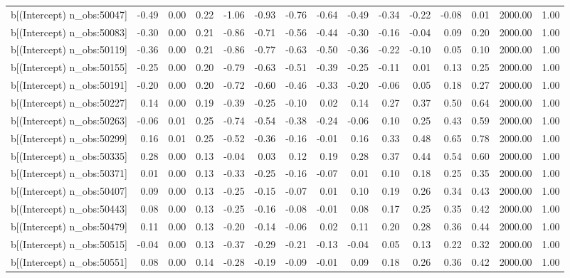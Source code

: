 \begin{table}[ht]
\begin{tabular}{rrrrrrrrrrrrrrr}
  b[(Intercept) n\_obs:50047] & -0.49 & 0.00 & 0.22 & -1.06 & -0.93 & -0.76 & -0.64 & -0.49 & -0.34 & -0.22 & -0.08 & 0.01 & 2000.00 & 1.00 \\ 
  b[(Intercept) n\_obs:50083] & -0.30 & 0.00 & 0.21 & -0.86 & -0.71 & -0.56 & -0.44 & -0.30 & -0.16 & -0.04 & 0.09 & 0.20 & 2000.00 & 1.00 \\ 
  b[(Intercept) n\_obs:50119] & -0.36 & 0.00 & 0.21 & -0.86 & -0.77 & -0.63 & -0.50 & -0.36 & -0.22 & -0.10 & 0.05 & 0.10 & 2000.00 & 1.00 \\ 
  b[(Intercept) n\_obs:50155] & -0.25 & 0.00 & 0.20 & -0.79 & -0.63 & -0.51 & -0.39 & -0.25 & -0.11 & 0.01 & 0.13 & 0.25 & 2000.00 & 1.00 \\ 
  b[(Intercept) n\_obs:50191] & -0.20 & 0.00 & 0.20 & -0.72 & -0.60 & -0.46 & -0.33 & -0.20 & -0.06 & 0.05 & 0.18 & 0.27 & 2000.00 & 1.00 \\ 
  b[(Intercept) n\_obs:50227] & 0.14 & 0.00 & 0.19 & -0.39 & -0.25 & -0.10 & 0.02 & 0.14 & 0.27 & 0.37 & 0.50 & 0.64 & 2000.00 & 1.00 \\ 
  b[(Intercept) n\_obs:50263] & -0.06 & 0.01 & 0.25 & -0.74 & -0.54 & -0.38 & -0.24 & -0.06 & 0.10 & 0.25 & 0.43 & 0.59 & 2000.00 & 1.00 \\ 
  b[(Intercept) n\_obs:50299] & 0.16 & 0.01 & 0.25 & -0.52 & -0.36 & -0.16 & -0.01 & 0.16 & 0.33 & 0.48 & 0.65 & 0.78 & 2000.00 & 1.00 \\ 
  b[(Intercept) n\_obs:50335] & 0.28 & 0.00 & 0.13 & -0.04 & 0.03 & 0.12 & 0.19 & 0.28 & 0.37 & 0.44 & 0.54 & 0.60 & 2000.00 & 1.00 \\ 
  b[(Intercept) n\_obs:50371] & 0.01 & 0.00 & 0.13 & -0.33 & -0.25 & -0.16 & -0.07 & 0.01 & 0.10 & 0.18 & 0.25 & 0.35 & 2000.00 & 1.00 \\ 
  b[(Intercept) n\_obs:50407] & 0.09 & 0.00 & 0.13 & -0.25 & -0.15 & -0.07 & 0.01 & 0.10 & 0.19 & 0.26 & 0.34 & 0.43 & 2000.00 & 1.00 \\ 
  b[(Intercept) n\_obs:50443] & 0.08 & 0.00 & 0.13 & -0.25 & -0.16 & -0.08 & -0.01 & 0.08 & 0.17 & 0.25 & 0.35 & 0.42 & 2000.00 & 1.00 \\ 
  b[(Intercept) n\_obs:50479] & 0.11 & 0.00 & 0.13 & -0.20 & -0.14 & -0.06 & 0.02 & 0.11 & 0.20 & 0.28 & 0.36 & 0.44 & 2000.00 & 1.00 \\ 
  b[(Intercept) n\_obs:50515] & -0.04 & 0.00 & 0.13 & -0.37 & -0.29 & -0.21 & -0.13 & -0.04 & 0.05 & 0.13 & 0.22 & 0.32 & 2000.00 & 1.00 \\ 
  b[(Intercept) n\_obs:50551] & 0.08 & 0.00 & 0.14 & -0.28 & -0.19 & -0.09 & -0.01 & 0.09 & 0.18 & 0.26 & 0.36 & 0.42 & 2000.00 & 1.00 \\ 

\end{tabular}
\end{table}
